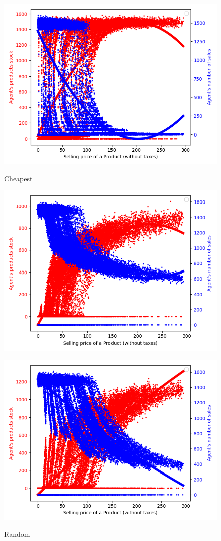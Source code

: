 {{{{{{{{{{{{{{    \begin{figure}[H]
            \includegraphics[width=\linewidth]{img/exp/16_1.png}\label{fig:cheapest}
            \caption{Cheapest}
        \endminipage\hfill
            \includegraphics[width=\linewidth]{img/exp/16_2.png}\label{fig:random}
            \caption{Random}
        \endminipage\hfill
            \includegraphics[width=\linewidth]{img/exp/16_3.png}\label{fig:weighted}

\end{figure}}}}}}}}}}}}}}}
